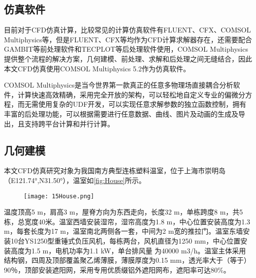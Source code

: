 	\subsection{仿真软件}
	目前对于CFD仿真计算，比较常见的计算仿真软件有FLUENT、CFX、COMSOL Multiphysics等，但是FLUENT、CFX等均作为CFD计算求解器存在，还需要配合GAMBIT等前处理软件和TECPLOT等后处理软件使用，COMSOL Multiphysics提供整个流程的解决方案，几何建模、前处理、求解和后处理之间无缝结合，因此本文CFD仿真使用COMSOL Multiphysics 5.2作为仿真软件。
	
COMSOL Multiphysics是当今世界第一款真正的任意多物理场直接耦合分析软件，计算快速高效精确，采用完全开放的架构，可以轻松地自定义专业的偏微分方程，而无需使用复杂的UDF开发，可以实现任意求解参数的独立函数控制，拥有丰富的后处理功能，可以根据需要进行任意数据、曲线、图片及动画的生成及导出，且支持跨平台计算和并行计算\supercite{Comsol2015}。

	\subsection{几何建模}
本文CFD仿真研究对象为我国南方典型连栋塑料温室，位于上海市崇明岛（E121.74°,N31.50°），温室如\ref{fig:House}所示。
	\begin{figure}[!htbp]
		\centering
		\texttt{[image: 15House.png]}
	\end{figure}
温度顶高5 m，肩高3 m，屋脊方向为东西走向，长度32 m，单栋跨度8 m，共5栋，总宽度40米。温室西墙安装湿帘，湿帘高度为1.8 m，中心位置安装高度为1.3 m，每套长度为17 m，温室南北两侧各一套，中间为2 m宽的推拉门。温室东墙安装10台YS1250型重锤式负压风机，每栋两台，风机直径为1250 mm，中心位置安装高度为1.5 m，电机功率为1.1 kW，单台排风量 为40000 m3/h。温室主体采用结构钢，四周及顶部覆盖聚乙烯薄膜，薄膜厚度为0.15 mm，透光率大于（等于）90％，顶部安装遮阳网，采用专用优质缀铝外遮阳网布，遮阳率可达80\%。

